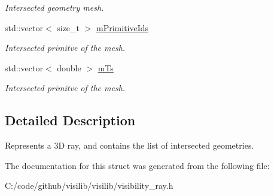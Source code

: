 \begin{DoxyCompactItemize}
\begin{DoxyCompactList}\small\item\em Intersected geometry mesh. \end{DoxyCompactList}\item 
\mbox{\label{structvisilib_1_1_visibility_ray_a544abf65e84c6ab85ba8b919b773b768}} 
std\+::vector$<$ size\+\_\+t $>$ \mbox{\hyperlink{structvisilib_1_1_visibility_ray_a544abf65e84c6ab85ba8b919b773b768}{m\+Primitive\+Ids}}
\begin{DoxyCompactList}\small\item\em Intersected primitve of the mesh. \end{DoxyCompactList}\item 
\mbox{\label{structvisilib_1_1_visibility_ray_ac2a55af977beb87b9c1ce11667c12850}} 
std\+::vector$<$ double $>$ \mbox{\hyperlink{structvisilib_1_1_visibility_ray_ac2a55af977beb87b9c1ce11667c12850}{m\+Ts}}
\begin{DoxyCompactList}\small\item\em Intersected primitve of the mesh. \end{DoxyCompactList}\end{DoxyCompactItemize}


\subsection{Detailed Description}
Represents a 3D ray, and contains the list of intersected geometries. 

The documentation for this struct was generated from the following file\+:\begin{DoxyCompactItemize}
\item 
C\+:/code/github/visilib/visilib/visibility\+\_\+ray.\+h\end{DoxyCompactItemize}
